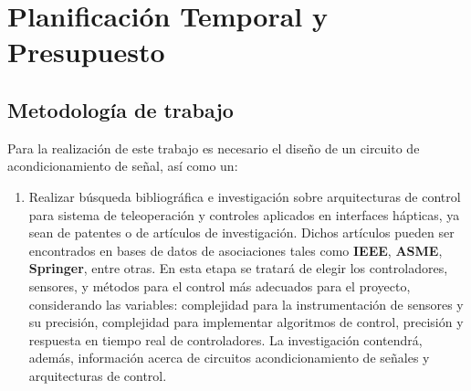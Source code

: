\chapter{Planificación Temporal y Presupuesto}




\section{Metodología de trabajo}

Para la realización de este trabajo es necesario el diseño de un circuito de acondicionamiento de señal, así como un:



\begin{enumerate} 
 \item Realizar búsqueda bibliográfica e investigación sobre arquitecturas de control para sistema de teleoperación y controles aplicados en interfaces hápticas, ya sean de patentes o de artículos de investigación. Dichos artículos pueden ser encontrados en bases de datos de asociaciones tales como \textbf{IEEE}, \textbf{ASME}, \textbf{Springer}, entre otras. En esta etapa se tratará de elegir los controladores, sensores, y métodos para el control más adecuados para el proyecto, considerando las variables: complejidad para la instrumentación de sensores y su precisión, complejidad para implementar algoritmos de control, precisión y respuesta en tiempo real de controladores. La investigación contendrá, además, información acerca de circuitos acondicionamiento de señales y arquitecturas de control.
  
  
 
 

\end{enumerate}
